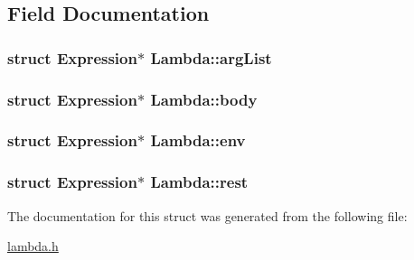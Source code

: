 \subsection{Field Documentation}
\hypertarget{structLambda_a7f50d0df92708ab9fc9d8c770e9adbaf}{
\subsubsection[{arg\+List}]{\setlength{\rightskip}{0pt plus 5cm}struct Expression$\ast$ Lambda\+::arg\+List}}\label{structLambda_a7f50d0df92708ab9fc9d8c770e9adbaf}
\hypertarget{structLambda_ae1902ae73a4e27fc6955f3446c9437dc}{
\subsubsection[{body}]{\setlength{\rightskip}{0pt plus 5cm}struct Expression$\ast$ Lambda\+::body}}\label{structLambda_ae1902ae73a4e27fc6955f3446c9437dc}
\hypertarget{structLambda_a398dff8c18b26fe96946ec73481aa16a}{
\subsubsection[{env}]{\setlength{\rightskip}{0pt plus 5cm}struct Expression$\ast$ Lambda\+::env}}\label{structLambda_a398dff8c18b26fe96946ec73481aa16a}
\hypertarget{structLambda_a8607b673156a25c738c915d315c46c8b}{
\subsubsection[{rest}]{\setlength{\rightskip}{0pt plus 5cm}struct Expression$\ast$ Lambda\+::rest}}\label{structLambda_a8607b673156a25c738c915d315c46c8b}


The documentation for this struct was generated from the following file\+:\begin{DoxyCompactItemize}
\item 
\hyperlink{lambda_8h}{lambda.\+h}\end{DoxyCompactItemize}
